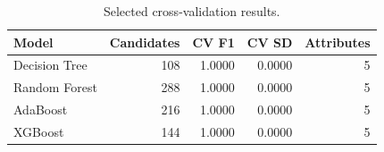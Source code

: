 \begin{table}[H]
\centering\small
\caption{Selected cross-validation results.}
\begin{tabular}{lrrrr}
\toprule
Model & Candidates & CV F1 & CV SD & Attributes \\
\midrule
Decision Tree & 108 & 1.0000 & 0.0000 & 5 \\
Random Forest & 288 & 1.0000 & 0.0000 & 5 \\
AdaBoost & 216 & 1.0000 & 0.0000 & 5 \\
XGBoost & 144 & 1.0000 & 0.0000 & 5 \\
\bottomrule
\end{tabular}
\end{table}
